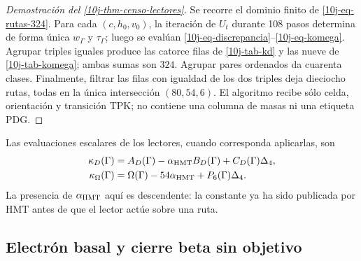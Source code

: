 \begin{proof}[Demostración del \cref{10j-thm-censo-lectores}]
Se recorre el dominio finito de \eqref{10j-eq-rutas-324}. Para cada
\((c,h_0,v_0)\), la iteración de \(U_t\) durante 108 pasos determina de
forma única \(w_\Gamma\) y \(\tau_\Gamma\); luego se evalúan
\eqref{10j-eq-discrepancia}--\eqref{10j-eq-komega}. Agrupar triples iguales
produce las catorce filas de \cref{10j-tab-kd} y las nueve de
\cref{10j-tab-komega}; ambas sumas son \(324\). Agrupar pares ordenados da
cuarenta clases. Finalmente, filtrar las filas con igualdad de los dos
triples deja dieciocho rutas, todas en la única intersección
\((80,54,6)\). El algoritmo recibe sólo celda, orientación y transición
TPK; no contiene una columna de masas ni una etiqueta PDG.
\end{proof}

Las evaluaciones escalares de los lectores, cuando corresponda aplicarlas,
son
\begin{align}
 \kappa_D(\Gamma)
 &=A_D(\Gamma)-\alpha_{\rm HMT}B_D(\Gamma)
   +C_D(\Gamma)\Delta_4,
 \label{10j-eq-kappa-d}\\
 \kappa_\Omega(\Gamma)
 &=\Omega(\Gamma)-54\alpha_{\rm HMT}
   +P_6(\Gamma)\Delta_4.
 \label{10j-eq-kappa-omega}
\end{align}
La presencia de \(\alpha_{\rm HMT}\) aquí es descendente: la constante ya
ha sido publicada por HMT antes de que el lector actúe sobre una ruta.

\subsection{Electrón basal y cierre beta sin objetivo}


